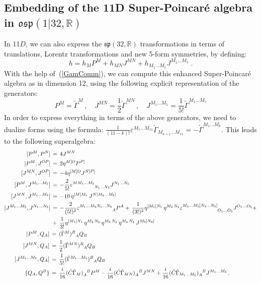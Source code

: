 \documentclass[a4paper,11pt]{article}
\def\G{{\Gamma}}
\begin{document}
\subsection{Embedding of the 11D Super-Poincar\'e algebra in $\mathfrak{osp}(1|32,\mathbb{R})$ }
In 11$D$, we can also express the $\mathfrak{sp}(32,\mathbb{R})$ transformations in terms of translations, 
Lorentz transformations and new 5-form symmetries, by defining:
\begin{equation}
h = h_M P^M + h_{MN} J^{MN} + h_{M_1\ldots M_5} J^{M_1\ldots M_5}\;.
\end{equation}
With the help of~(\ref{GamComm}), we can compute this enhanced Super-Poincar\'e algebra 
as in dimension 12, using the following explicit representation of the generators:
\begin{equation}
P^M = \tilde{\Gamma}^{M} \,,\quad
J^{MN} =\frac{1}{2} \tilde{\Gamma}^{MN} \,,\quad
J^{M_1\ldots M_5} = \frac{1}{5!}\tilde{\Gamma}^{M_1\ldots M_5}
\end{equation}
In order to express everything in terms of the above generators, we need to dualize forms using the formula:
$\frac{1}{(11-k)!} \varepsilon^{M_1 \ldots M_{11}} \tilde{\Gamma}_{M_{k+1} \ldots 
M_{11}} = - \tilde{\Gamma}^{M_1 \ldots M_k}$.
This leads to the following superalgebra:
\begin{align}\label{AdS11}
[P^M,P^N] &\,=\, 4 J^{MN} \notag\\
[P^M,J^{OP}] &\,=\, 2 \eta^{M [O} P^{P]} \notag\\
[J^{MN},J^{OP}] &\,=\, -4 \eta^{[M [O} J^{N] P]} \notag\\
[P^M,J^{M_1\ldots M_5}] &\,=\, -\frac{2}{5!} \varepsilon^{M M_1\ldots
M_5}_{\phantom{M M_1\ldots M_5} N_1 \ldots N_5} J^{N_1\ldots N_5} \notag\\
[J^{MN},J^{M_1\ldots M_5}] &\,=\,-10\,\eta^{[M[M_1}\,J^{N]M_2\ldots M_5]} \notag\\ 
[J^{M_1\ldots M_5},J^{N_1\ldots N_5}] 
&\,=\,-\frac{2}{(5!)^2}\varepsilon^{M_1\ldots M_5 N_1\ldots
N_5}_{\phantom{M_1\ldots M_5 N_1\ldots N_5} A} P^A +\,\frac{1}{(3!)^2}\eta^{[M_1[N_1}\,\eta^{M_2\,N_2}\varepsilon^{M_3
\ldots M_5] N_3\ldots N_5]}_{\phantom{M_1\ldots M_5] N_1\ldots N_5]} O_1 
\ldots O_5} J^{O_1\ldots O_5} +\notag\\
&\,+\,\frac{1}{3!}\eta^{[M_1[N_1}\,\eta^{M_2\,N_2}\,\eta^{M_3\,N_3}\,\eta^{M_4\,N_4}\,J^{M_5]
N_5]}\\
[P^M,Q_A]\,&=\,(\tilde{\G}^M)^B_{\phantom{B}A} Q_B\notag\\
[J^{MN},Q_A]\,&=\, \frac{1}{2}(\tilde{\G}^{MN})^B_{\phantom{B}A} Q_B\notag\\
[J^{M_1\ldots M_5},Q_A]\,&=\, \frac{1}{5!}(\tilde{\G}^{M_1\ldots M_5})^B_{\phantom{B}A} Q_B
\notag\\
\{Q_A,Q^B\} \,&=\,\frac{i}{16} (\tilde{C} \tilde{\Gamma}_{M})_A^{\phantom{A}B} P^M -
\frac{i}{16} (\tilde{C} \tilde{\Gamma}_{MN})_A^{\phantom{A}B} J^{MN}
+ \frac{i}{16} (\tilde{C} \tilde{\Gamma}_{M_1\ldots M_5})_A^{\phantom{A}B} J^{M_1\ldots M_5}\,.\notag
\end{align}
\end{document}
